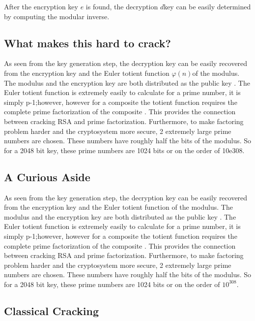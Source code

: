 \documentclass[journal]{IEEEtran}
\begin{document}
After the encryption key \(e\) is found, the decryption \(d\)key can be easily determined by computing the modular inverse.

\subsection{What makes this hard to crack?}
As seen from the key generation step, the decryption key can be easily recovered
from the encryption key and the Euler totient function \(\varphi(n)\)of the modulus. The
modulus and the encryption key are both distributed as the public key . The
Euler totient function is extremely easily to calculate for a prime number, it
is simply p-1;however, however for a composite the totient function requires the
complete prime factorization of the composite . This provides the connection
between cracking RSA and prime factorization.   Furthermore, to make factoring
problem harder and the cryptosystem more secure, 2 extremely large prime numbers
are chosen. These numbers have roughly half the bits of the modulus. So for a
2048 bit key, these prime numbers are 1024 bits or on the order of 10e308.
\subsection{A Curious Aside}

As seen from the key generation step, the decryption key can be easily recovered
from the encryption key and the Euler totient function of the modulus. The
modulus and the encryption key are both distributed as the public key . The
Euler totient function is extremely easily to calculate for a prime number, it
is simply p-1;however, however for a composite the totient function requires the
complete prime factorization of the composite . This provides the connection
between cracking RSA and prime factorization.   Furthermore, to make factoring
problem harder and the cryptosystem more secure, 2 extremely large prime numbers
are chosen. These numbers have roughly half the bits of the modulus. So for a
2048 bit key, these prime numbers are 1024 bits or on the order of \(10^{308}\).

\subsection{Classical Cracking}
\end{document}
